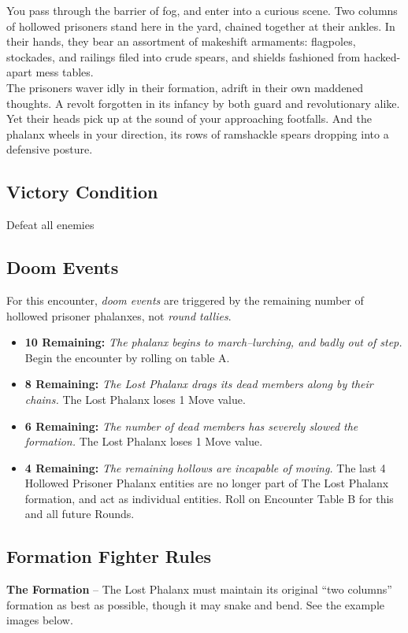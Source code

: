 You pass through the barrier of fog, and enter into a curious scene. Two columns of hollowed prisoners stand here in the yard, chained together at their ankles. In their hands, they bear an assortment of makeshift armaments: flagpoles, stockades, and railings filed into crude spears, and shields fashioned from hacked-apart mess tables.\\

The prisoners waver idly in their formation, adrift in their own maddened thoughts. A revolt forgotten in its infancy by both guard and revolutionary alike. Yet their heads pick up at the sound of your approaching footfalls. And the phalanx wheels in your direction, its rows of ramshackle spears dropping into a defensive posture.

\subsection*{Victory Condition}
Defeat all enemies

\subsection*{Doom Events}
For this encounter, \emph{doom events} are triggered by the remaining number of hollowed prisoner phalanxes, not \emph{round tallies}.

\begin{itemize}
\item \textbf{10 Remaining:} \emph{The phalanx begins to march--lurching, and badly out of step.} Begin the encounter by rolling on table A.
\item \textbf{8 Remaining:} \emph{The Lost Phalanx drags its dead members along by their chains.} The Lost Phalanx loses 1 Move value.
\item \textbf{6 Remaining:} \emph{The number of dead members has severely slowed the formation.} The Lost Phalanx loses 1 Move value.
\item \textbf{4 Remaining:} \emph{The remaining hollows are incapable of moving.} The last 4 Hollowed Prisoner Phalanx entities are no longer part of The Lost Phalanx formation, and act as individual entities. Roll on Encounter Table B for this and all future Rounds.
\end{itemize}

\pagebreak

\subsection*{Formation Fighter Rules}
\textbf{The Formation} -- The Lost Phalanx must maintain its original “two columns” formation as best as possible, though it may snake and bend. See the example images below.\\

